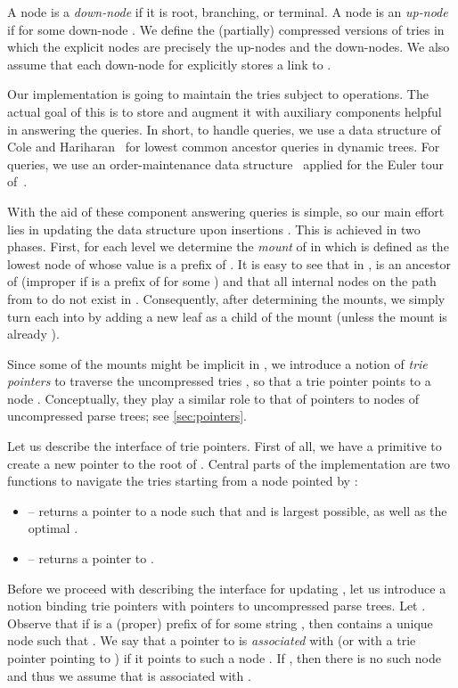 \documentclass[a4paper]{article}
\theoremstyle{remark}
\begin{document}
A node  is a \emph{down-node} if it is root, branching, or terminal.
A node  is an \emph{up-node} if  for some down-node
.
We define the (partially) compressed versions  of tries  in which the explicit
nodes are precisely the up-nodes and the down-nodes. We also assume that each down-node 
for  explicitly stores a link to .

Our implementation is going to maintain the tries  subject to   operations.
The actual goal of this is to store  and augment it with auxiliary components helpful in answering the queries.
In short, to handle  queries, we use a data structure of Cole and Hariharan~\cite{Cole:2005} for
lowest common ancestor queries in dynamic trees.
For  queries, we use an order-maintenance data structure~\cite{Dietz:1987,Bender:2002}
applied for the Euler tour of~.



With the aid of these component answering queries is simple, so our main effort lies in updating the data structure upon insertions .
This is achieved in two phases. First, for each level  we determine the \emph{mount} of  in 
which is defined as the lowest node  of  whose value 
is a prefix of . It is easy to see that in ,  is an ancestor of   (improper if  is a prefix of  for some )
and that all internal nodes on the path from  to  do not exist in .
Consequently, after determining the mounts, we simply turn each  into 
by adding a new leaf as a child of the mount (unless the mount is already ).


Since some of the mounts might be implicit in , we introduce a notion of \emph{trie pointers} to traverse the uncompressed tries
, so that a trie pointer  points to a node .  Conceptually, they play a similar role to that of pointers to nodes of uncompressed parse trees; see \cref{sec:pointers}.

Let us describe the interface of trie pointers.
First of all, we have a primitive  to create a new pointer to the root of .
Central parts of the implementation are two functions to navigate the tries starting from a node  pointed by :
\begin{itemize}
  \item  -- returns a pointer to a node  such that 
  and  is largest possible, as well as the optimal .
  \item  -- returns a pointer to .
\end{itemize}

Before we proceed with describing the interface for updating , let us introduce a notion binding trie pointers with pointers to uncompressed parse trees. Let .
Observe that if  is a (proper) prefix of  for some string ,
then  contains a unique node  such that .
We say that a pointer  to  is \emph{associated} with  (or with a trie pointer  pointing to ) if it points to such a node .  If , then
there is no such node  and thus we assume that  is associated with .
\end{document}
